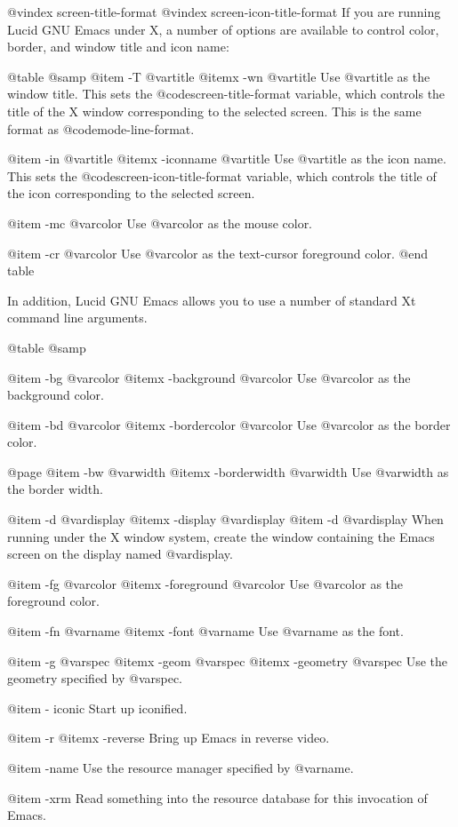 {{@vindex screen-title-format
@vindex screen-icon-title-format
If you are running Lucid GNU Emacs under X, a number of options are
available to control color, border, and window title and icon name:

@table @samp
@item -T @var{title}
@itemx -wn @var{title}
Use @var{title} as the window title. This sets the
@code{screen-title-format} variable, which controls the title of the X
window corresponding to the selected screen.  This is the same format as
@code{mode-line-format}.

@item -in @var{title}
@itemx -iconname @var{title}
Use @var{title} as the icon name. This sets the
@code{screen-icon-title-format} variable, which controls the title of
the icon corresponding to the selected screen.

@item -mc @var{color}
Use @var{color} as the mouse color.

@item -cr @var{color}
Use @var{color} as the text-cursor foreground color.
@end table

In addition, Lucid GNU Emacs allows you to use a number of standard Xt
command line arguments. 

@table @samp

@item -bg @var{color}
@itemx -background @var{color}
Use @var{color} as the background color.

@item -bd @var{color}
@itemx -bordercolor @var{color}
Use @var{color} as the border color.

@page
@item -bw @var{width}
@itemx -borderwidth @var{width}
Use @var{width} as the border width.

@item -d @var{display}
@itemx -display @var{display}
@item -d @var{display}
When running under the X window system, create the window containing the
Emacs screen on the display named @var{display}.

@item -fg @var{color}
@itemx -foreground @var{color}
Use @var{color} as the foreground color.

@item -fn @var{name}
@itemx -font @var{name}
Use @var{name} as the font.

@item -g @var{spec}
@itemx -geom @var{spec}
@itemx -geometry @var{spec}
Use the geometry specified by @var{spec}.

@item - iconic
Start up iconified.

@item -r
@itemx -reverse
Bring up Emacs in reverse video.

@item -name
Use the resource manager specified by @var{name}.

@item -xrm
Read something into the resource database for this invocation of Emacs. 

}}
